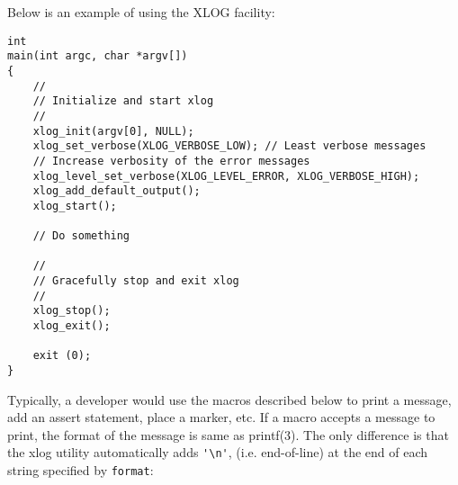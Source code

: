 \documentclass[11pt]{article}
\begin{document}
Below is an example of using the XLOG facility:

\begin{verbatim}
int
main(int argc, char *argv[])
{
    //
    // Initialize and start xlog
    //
    xlog_init(argv[0], NULL);
    xlog_set_verbose(XLOG_VERBOSE_LOW);	// Least verbose messages
    // Increase verbosity of the error messages
    xlog_level_set_verbose(XLOG_LEVEL_ERROR, XLOG_VERBOSE_HIGH);
    xlog_add_default_output();
    xlog_start();

    // Do something

    //
    // Gracefully stop and exit xlog
    //
    xlog_stop();
    xlog_exit();

    exit (0);
}
\end{verbatim}


Typically, a developer would use the macros described below
to print a message, add an assert statement, place a marker, etc.
If a macro accepts a message to print, the format of the message is same
as printf(3). The only difference is that the xlog utility automatically
adds \verb='\n'=, (i.e. end-of-line) at the end of each string
specified by \verb=format=:
\end{document}
